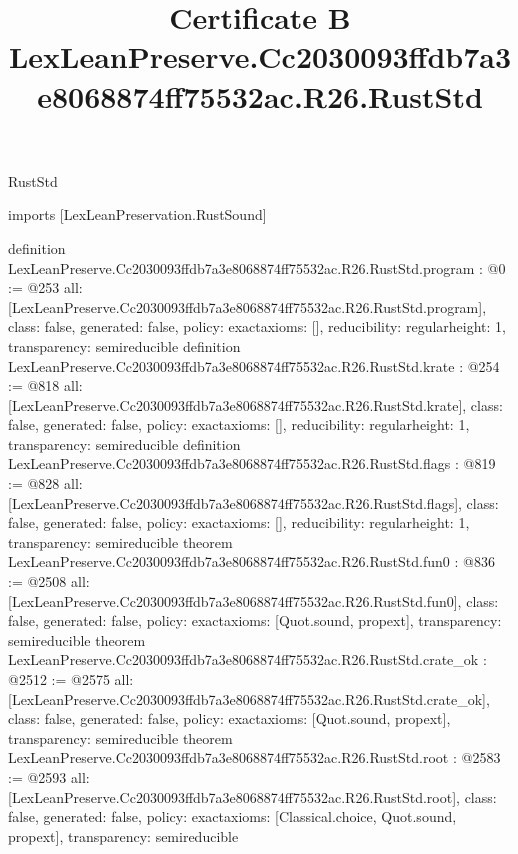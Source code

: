 \begin{lexlean}{RustStd}
\title{Certificate B LexLeanPreserve.Cc2030093ffdb7a3e8068874ff75532ac.R26.RustStd}
\begin{coremodule}
imports [LexLeanPreservation.RustSound]

definition LexLeanPreserve.Cc2030093ffdb7a3e8068874ff75532ac.R26.RustStd.program : @0 := @253 {
  all: [LexLeanPreserve.Cc2030093ffdb7a3e8068874ff75532ac.R26.RustStd.program],
  class: false,
  generated: false,
  policy: exact{axioms: []},
  reducibility: regular{height: 1},
  transparency: semireducible
}
definition LexLeanPreserve.Cc2030093ffdb7a3e8068874ff75532ac.R26.RustStd.krate : @254 := @818 {
  all: [LexLeanPreserve.Cc2030093ffdb7a3e8068874ff75532ac.R26.RustStd.krate],
  class: false,
  generated: false,
  policy: exact{axioms: []},
  reducibility: regular{height: 1},
  transparency: semireducible
}
definition LexLeanPreserve.Cc2030093ffdb7a3e8068874ff75532ac.R26.RustStd.flags : @819 := @828 {
  all: [LexLeanPreserve.Cc2030093ffdb7a3e8068874ff75532ac.R26.RustStd.flags],
  class: false,
  generated: false,
  policy: exact{axioms: []},
  reducibility: regular{height: 1},
  transparency: semireducible
}
theorem LexLeanPreserve.Cc2030093ffdb7a3e8068874ff75532ac.R26.RustStd.fun0 : @836 := @2508 {
  all: [LexLeanPreserve.Cc2030093ffdb7a3e8068874ff75532ac.R26.RustStd.fun0],
  class: false,
  generated: false,
  policy: exact{axioms: [Quot.sound, propext]},
  transparency: semireducible
}
theorem LexLeanPreserve.Cc2030093ffdb7a3e8068874ff75532ac.R26.RustStd.crate_ok : @2512 := @2575 {
  all: [LexLeanPreserve.Cc2030093ffdb7a3e8068874ff75532ac.R26.RustStd.crate_ok],
  class: false,
  generated: false,
  policy: exact{axioms: [Quot.sound, propext]},
  transparency: semireducible
}
theorem LexLeanPreserve.Cc2030093ffdb7a3e8068874ff75532ac.R26.RustStd.root : @2583 := @2593 {
  all: [LexLeanPreserve.Cc2030093ffdb7a3e8068874ff75532ac.R26.RustStd.root],
  class: false,
  generated: false,
  policy: exact{axioms: [Classical.choice, Quot.sound, propext]},
  transparency: semireducible
}


\end{coremodule}
\end{lexlean}
